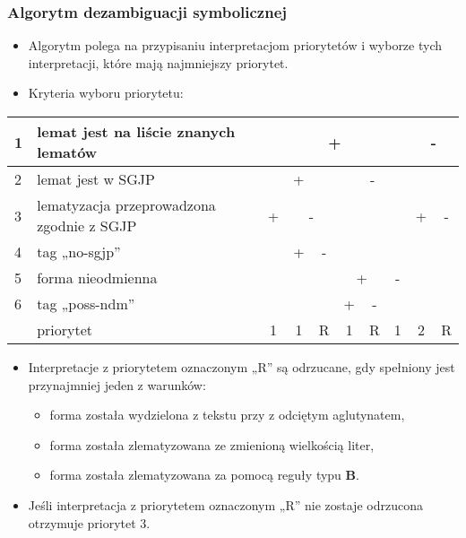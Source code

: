 \documentclass{beamer}
\begin{document}
\begin{frame}
\frametitle{Algorytm dezambiguacji symbolicznej}
\begin{itemize}
\item Algorytm polega na przypisaniu interpretacjom priorytetów i wyborze tych interpretacji, które mają najmniejszy priorytet.
\item Kryteria wyboru priorytetu:
\end{itemize}
\begin{center}\begin{scriptsize}
\begin{tabular}{|l|l|c|c|c|c|c|c|c|c|}
\hline
1 & lemat jest na liście znanych lematów & \multicolumn{6}{c|}{+} & \multicolumn{2}{c|}{-} \\
\hline
2 & lemat jest w SGJP & \multicolumn{3}{c|}{+} & \multicolumn{3}{c|}{-} & \multicolumn{2}{c|}{} \\
\hline
3 & lematyzacja przeprowadzona zgodnie z SGJP & + & \multicolumn{2}{|c|}{-} & \multicolumn{3}{c|}{} & + & - \\
\hline
4 & tag „no-sgjp” & & + & - & \multicolumn{3}{|c|}{} & & \\
\hline
5 & forma nieodmienna & & & & \multicolumn{2}{c|}{+} & - & & \\
\hline
6 & tag „poss-ndm” & & & & + & - & & & \\
\hline
 & priorytet & 1 & 1 & R & 1 & R & 1 & 2 & R \\
\hline
\end{tabular}\end{scriptsize}
\end{center}
\begin{itemize}
\item Interpretacje z priorytetem oznaczonym „R” są odrzucane, gdy spełniony jest przynajmniej jeden z warunków:
\begin{itemize}
\item forma została wydzielona z tekstu przy z odciętym aglutynatem,
\item forma została zlematyzowana ze zmienioną  wielkością liter,
\item forma została zlematyzowana za pomocą reguły typu {\bf B}.
\end{itemize}
\item Jeśli interpretacja z priorytetem oznaczonym „R” nie zostaje odrzucona otrzymuje priorytet 3.
\end{itemize}
\end{frame}
\end{document}

